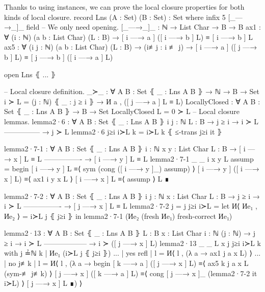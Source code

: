 \documentclass[logo,bsc,singlespacing,parskip,online]{infthesis}
\renewenvironment{code}{\mintedcopy[breaklines,breaksymbolleft=\;]{agda}}{\endmintedcopy}
\begin{document}
Thanks to using instances, we can prove the local closure properties for both kinds of local
closure.
\begin{code}
  record Lns (A : Set) (B : Set) : Set where
    infix 5 [_—→_]_
    field
      -- We only need opening.
      [_—→_]_ : ℕ → List Char → B → B
      ax1 : ∀ (i : ℕ) (a b : List Char) (L : B)
        → [ i —→ a ] ([ i —→ b ] L) ≡ [ i —→ b ] L
      ax5 : ∀ (i j : ℕ) (a b : List Char) (L : B)
        → (i≢j : i ≢ j)
        → [ i —→ a ] ([ j —→ b ] L) ≡ [ j —→ b ] ([ i —→ a ] L)

  open Lns ⦃ ... ⦄


  -- Local closure definition.
  _≻_ : ∀ {A B : Set} ⦃ _ : Lns A B ⦄ → ℕ → B → Set
  i ≻ L = (j : ℕ) ⦃ _ : j ≥ i ⦄ → И a , ([ j —→ a ] L ≡ L)
  LocallyClosed : ∀ {A B : Set} ⦃ _ : Lns A B ⦄ → B → Set
  LocallyClosed L = 0 ≻ L
  -- Local closure lemmas.
  lemma2·6 : ∀ {A B : Set} ⦃ _ : Lns A B ⦄ {i j : ℕ} {L : B}
    → j ≥ i   → i ≻ L
      ---------------
    → j ≻ L
  lemma2·6 j≥i i≻L k = i≻L k ⦃ ≤-trans j≥i it ⦄

  lemma2·7-1 : ∀ {A B : Set} ⦃ _ : Lns A B ⦄ {i : ℕ} {x y : List Char} {L : B}
    → [ i —→ x ] L ≡ L
      ----------------
    → [ i —→ y ] L ≡ L
  lemma2·7-1 {_} {_} {i} {x} {y} {L} assump =
    begin
      [ i —→ y ] L
    ≡⟨ sym (cong ([ i —→ y ]_) assump) ⟩
      [ i —→ y ] ([ i —→ x ] L)
    ≡⟨ ax1 i y x L ⟩
      [ i —→ x ] L
    ≡⟨ assump ⟩
      L
    ∎

  lemma2·7-2 : ∀ {A B : Set} ⦃ _ : Lns A B ⦄ {i j : ℕ} {x : List Char} {L : B}
    → j ≥ i → i ≻ L
      ----------------
    → [ j —→ x ] L ≡ L
  lemma2·7-2 {j = j} j≥i i≻L =
    let И⟨ Иe₁ , Иe₂ ⟩ = i≻L j ⦃ j≥i ⦄ in
      lemma2·7-1 (Иe₂ (fresh Иe₁) {fresh-correct Иe₁})

  lemma2·13 : ∀ {A B : Set} ⦃ _ : Lns A B ⦄ {L : B} {x : List Char} {i : ℕ} (j : ℕ)
    → j ≥ i      → i ≻ L
      ------------------
    → i ≻ ([ j —→ x ] L)
  lemma2·13 {_} {_} {L} {x} j j≥i i≻L k
    with j ≟ℕ k | Иe₁ (i≻L j ⦃ j≥i ⦄)
  ... | yes refl | l = И⟨ l , (λ a → ax1 j a x L) ⟩
  ... | no  j≢k  | l = И⟨ l , (λ a →
    begin
      [ k —→ a ] ([ j —→ x ] L)
    ≡⟨ ax5 k j a x L (sym-≢ j≢k) ⟩
      [ j —→ x ] ([ k —→ a ] L)
    ≡⟨ cong [ j —→ x ]_ (lemma2·7-2 it i≻L) ⟩
      [ j —→ x ] L
    ∎) ⟩


\end{code}
\end{document}
